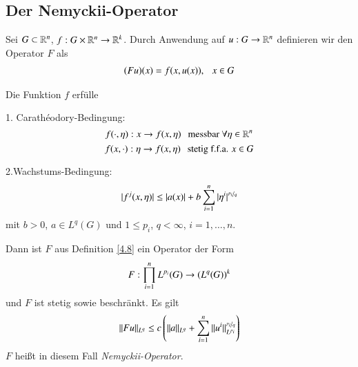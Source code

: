 \subsection{Der Nemyckii-Operator}

\begin{defi}\label{4.8}
    Sei $G\subset \mathbb{R}^n$, $f:G\times \mathbb{R}^n\rightarrow \mathbb{R}^k$. Durch Anwendung auf $u:G\rightarrow \mathbb{R}^n$ definieren
    wir den Operator $F$ als
    \begin{align}
        (Fu)(x)=f(x,u(x)), \hspace{.25cm} x\in G
    \end{align}
\end{defi}

\begin{lem}\label{4.9}
    Die Funktion $f$ erfülle
    \begin{description}
        \item{1. Carathéodory-Bedingung:}
        \[
            f(\cdot,\eta): x \rightarrow f(x,\eta) \hspace{.25cm} \text{messbar } \forall \eta\in \mathbb{R}^n
        \]
        \[
            f(x,\cdot):\eta\rightarrow f(x,\eta) \hspace{.25cm} \text{stetig f.f.a. } x\in G
        \]
        \item{2.Wachstums-Bedingung:}
        \[
            |f^j(x,\eta)|\leq |a(x)|+ b \sum_{i=1}^n|\eta^i|^{\nicefrac{p_i}{q}}
        \]
        mit $b>0$, $a\in L^q(G)$ und $1\leq p_i$, $q<\infty$, $i=1,…,n$. 
    \end{description}
    Dann ist $F$ aus Definition \ref{4.8} ein Operator der Form
    \[
        F:\prod_{i=1}^n L^{p_i}(G) \rightarrow (L^q(G))^k
    \]
    und $F$ ist stetig sowie beschränkt. Es gilt
    \[
        \|Fu\|_{L^q}\leq c\left( \|a\|_{L^q} + \sum_{i=1}^n \|u^i\|_{L^{p_i}}^{\nicefrac{p_i}{q}} \right)
    \]
    $F$ heißt in diesem Fall \textit{Nemyckii-Operator}.
\end{lem}

